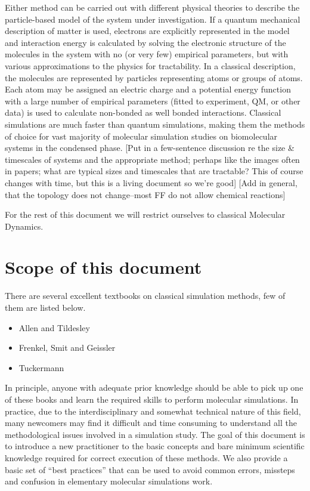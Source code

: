\documentclass[9pt,bestpractices]{livecoms}
\begin{document}
Either method can be carried out with different physical theories to describe the particle-based model of the system under investigation. If a quantum mechanical description of matter is used, electrons are explicitly represented in the model and interaction energy is calculated by solving the electronic structure of the molecules in the system with no (or very few) empirical parameters, but with various approximations to the physics for tractability. In a classical description, the molecules are represented by particles representing atoms or groups of atoms. Each atom may be assigned an electric charge and a potential energy function with a large number of empirical parameters (fitted to experiment, QM, or other data)  is used to calculate non-bonded as well bonded interactions. Classical simulations are much faster than quantum simulations, making them the methods of choice for vast majority of molecular simulation studies on biomolecular systems in the condensed phase. {\color{red} [Put in a few-sentence discussion re the size \& timescales of systems and the appropriate method; perhaps like the images often in papers; what are typical sizes and timescales that are tractable? This of course changes with time, but this is a living document so we’re good] [Add in general, that the topology does not change--most FF do not allow chemical reactions]}

For the rest of this document we will restrict ourselves to classical Molecular Dynamics.

\section{Scope of this document}
There are several excellent textbooks on classical simulation methods, few of them are listed below.

\begin{itemize}
\item Allen and Tildesley
\item Frenkel, Smit and Geissler
\item Tuckermann
\end{itemize}

In principle, anyone with adequate prior knowledge should be able to pick up one of these books and learn the required skills to perform molecular simulations. In practice, due to the interdisciplinary and somewhat technical nature of this field, many newcomers may find it difficult and time consuming to understand all the methodological issues involved in a simulation study.   The goal of this document is to introduce a new practitioner to the basic concepts and bare minimum scientific knowledge required for correct execution of these methods. We also provide a basic set of “best practices” that can be used to avoid common errors, missteps and confusion in elementary molecular simulations work. 
\end{document}
